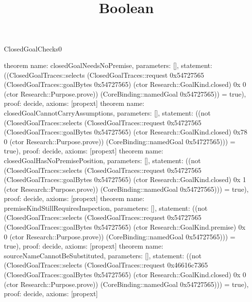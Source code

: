 \begin{lexlean}{ClosedGoalChecks0}
\title{Boolean}
\begin{semanticmodule}
theorem{
 name: closedGoalNeedsNoPremise,
 parameters: [],
 statement: ((ClosedGoalTraces::selects (ClosedGoalTraces::request 0x54727565 (ClosedGoalTraces::goalBytes 0x54727565) (ctor Research::GoalKind.closed) 0x 0 (ctor Research::Purpose.prove)) (CoreBinding::namedGoal 0x54727565)) = true),
 proof: decide{},
 axioms: [propext]
}
theorem{
 name: closedGoalCannotCarryAssumptions,
 parameters: [],
 statement: ((not (ClosedGoalTraces::selects (ClosedGoalTraces::request 0x54727565 (ClosedGoalTraces::goalBytes 0x54727565) (ctor Research::GoalKind.closed) 0x78 0 (ctor Research::Purpose.prove)) (CoreBinding::namedGoal 0x54727565))) = true),
 proof: decide{},
 axioms: [propext]
}
theorem{
 name: closedGoalHasNoPremisePosition,
 parameters: [],
 statement: ((not (ClosedGoalTraces::selects (ClosedGoalTraces::request 0x54727565 (ClosedGoalTraces::goalBytes 0x54727565) (ctor Research::GoalKind.closed) 0x 1 (ctor Research::Purpose.prove)) (CoreBinding::namedGoal 0x54727565))) = true),
 proof: decide{},
 axioms: [propext]
}
theorem{
 name: premiseKindStillRequiresInspection,
 parameters: [],
 statement: ((not (ClosedGoalTraces::selects (ClosedGoalTraces::request 0x54727565 (ClosedGoalTraces::goalBytes 0x54727565) (ctor Research::GoalKind.premise) 0x 0 (ctor Research::Purpose.prove)) (CoreBinding::namedGoal 0x54727565))) = true),
 proof: decide{},
 axioms: [propext]
}
theorem{
 name: sourceNameCannotBeSubstituted,
 parameters: [],
 statement: ((not (ClosedGoalTraces::selects (ClosedGoalTraces::request 0x46616c7365 (ClosedGoalTraces::goalBytes 0x54727565) (ctor Research::GoalKind.closed) 0x 0 (ctor Research::Purpose.prove)) (CoreBinding::namedGoal 0x54727565))) = true),
 proof: decide{},
 axioms: [propext]
}
\end{semanticmodule}
\end{lexlean}
